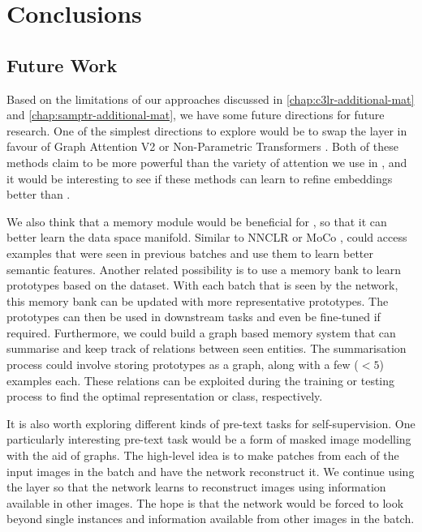 \chapter{Conclusions}\label{chap:future-work}


\section{Future Work}\label{sec:future-work}

Based on the limitations of our approaches discussed in \cref{chap:c3lr-additional-mat} and \cref{chap:samptr-additional-mat}, we have some future directions for future research.
One of the simplest directions to explore would be to swap the \samp{} layer in favour of Graph Attention V2 \parencite{brody2021attentive} or Non-Parametric Transformers \parencite{kossen2021self}. Both of these methods claim to be more powerful than the variety of attention we use in \samp{}, and it would be interesting to see if these methods can learn to refine embeddings better than \samp{}.

We also think that a memory module would be beneficial for \samptr{}, so that it can better learn the data space manifold. Similar to NNCLR \parencite{dwibedi2021little} or MoCo \parencite{He2015}, \samptr{} could access examples that were seen in previous batches and use them to learn better semantic features. 
Another related possibility is to use a memory bank to learn prototypes based on the dataset. With each batch that is seen by the network, this memory bank can be updated with more representative prototypes. The prototypes can then be used in downstream tasks and even be fine-tuned if required.
Furthermore, we could build a graph based memory system that can summarise and keep track of relations between seen entities. The summarisation process could involve storing prototypes as a graph, along with a few ($<5$) examples each. These relations can be exploited during the training or testing process to find the optimal representation or class, respectively.

It is also worth exploring different kinds of pre-text tasks for self-supervision. One particularly interesting pre-text task would be a form of masked image modelling \parencite{xie2022simmim, he2022masked} with the aid of graphs. The high-level idea is to make patches from each of the input images in the batch and have the network reconstruct it. We continue using the \samp{} layer so that the network learns to reconstruct images using information available in other images. The hope is that the network would be forced to look beyond single instances and  information available from other images in the batch.


